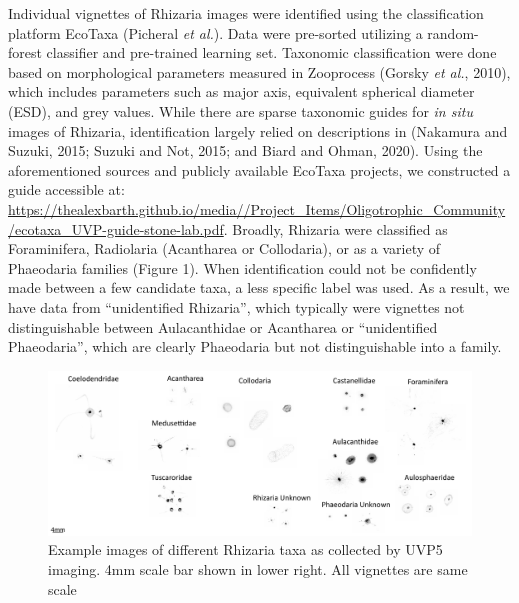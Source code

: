 \documentclass[
]{article}
\begin{document}
Individual vignettes of Rhizaria images were identified using the
classification platform EcoTaxa (Picheral \emph{et al.}). Data were
pre-sorted utilizing a random-forest classifier and pre-trained learning
set. Taxonomic classification were done based on morphological
parameters measured in Zooprocess (Gorsky \emph{et al.}, 2010), which
includes parameters such as major axis, equivalent spherical diameter
(ESD), and grey values. While there are sparse taxonomic guides for
\emph{in situ} images of Rhizaria, identification largely relied on
descriptions in (Nakamura and Suzuki, 2015; Suzuki and Not, 2015; and
Biard and Ohman, 2020). Using the aforementioned sources and publicly
available EcoTaxa projects, we constructed a guide accessible at:
\url{https://thealexbarth.github.io/media//Project_Items/Oligotrophic_Community/ecotaxa_UVP-guide-stone-lab.pdf}.
Broadly, Rhizaria were classified as Foraminifera, Radiolaria
(Acantharea or Collodaria), or as a variety of Phaeodaria families
(Figure 1). When identification could not be confidently made between a
few candidate taxa, a less specific label was used. As a result, we have
data from ``unidentified Rhizaria'', which typically were vignettes not
distinguishable between Aulacanthidae or Acantharea or ``unidentified
Phaeodaria'', which are clearly Phaeodaria but not distinguishable into
a family.

\begin{figure}[H]

{\centering \includegraphics{images/01_taxa.pdf}

}

\caption{Example images of different Rhizaria taxa as collected by UVP5
imaging. 4mm scale bar shown in lower right. All vignettes are same
scale}

\end{figure}%
\end{document}

